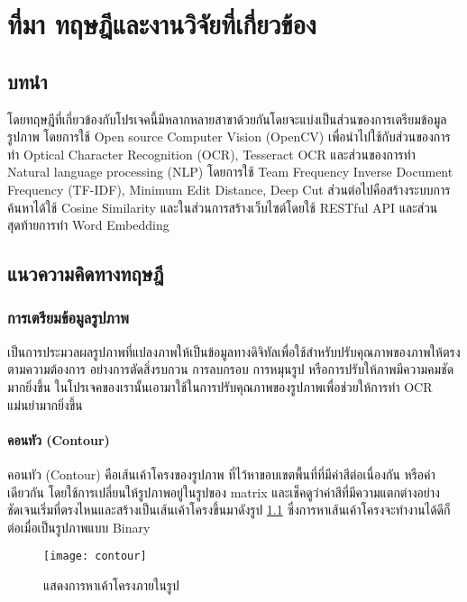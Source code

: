 \chapter{ที่มา ทฤษฎีและงานวิจัยที่เกี่ยวข้อง}
\section{บทนำ}

โดยทฤษฎีที่เกี่ยวข้องกับโปรเจคนี้มีหลากหลายสาขาด้วยกันโดยจะแบ่งเป็นส่วนของการเตรียมข้อมูลรูปภาพ โดยการใช้ Open source Computer Vision (OpenCV) เพื่อนำไปใช้กับส่วนของการทำ Optical Character Recognition (OCR), Tesseract OCR และส่วนของการทำ Natural language processing (NLP) โดยการใช้ Team Frequency Inverse Document Frequency (TF-IDF), Minimum Edit Distance,  Deep Cut ส่วนต่อไปคือสร้างระบบการค้นหาได้ใช้ Cosine Similarity และในส่วนการสร้างเว็บไซต์โดยใช้ RESTful API และส่วนสุดท้ายการทำ Word Embedding 

\section{แนวความคิดทางทฤษฎี}

\subsection{การเตรียมข้อมูลรูปภาพ}

เป็นการประมวลผลรูปภาพที่แปลงภาพให้เป็นข้อมูลทางดิจิทัลเพื่อใช้สำหรับปรับคุณภาพของภาพให้ตรงตามความต้องการ อย่างการตัดสิ่งรบกวน การลบกรอบ การหมุนรูป หรือการปรับให้ภาพมีความคมชัดมากยิ่งขึ้น ในโปรเจคของเรานั้นเอามาใช้ในการปรับคุณภาพของรูปภาพเพื่อช่วยให้การทำ OCR แม่นยำมากยิ่งขึ้น 

\subsubsection{คอนทัว (Contour) }

คอนทัว (Contour) \cite{doxygen} คือเส้นเค้าโครงของรูปภาพ ที่ไว้หาขอบเขตพื้นที่ที่มีค่าสีต่อเนื่องกัน หรือค่าเดียวกัน โดยใช้การเปลี่ยนให้รูปภาพอยู่ในรูปของ matrix และเช็คดูว่าค่าสีที่มีความแตกต่างอย่างชัดเจนเริ่มที่ตรงไหนและสร้างเป็นเส้นเค้าโครงขึ้นมาดังรูป \ref{fig:contour} ซึ่งการหาเส้นเค้าโครงจะทำงานได้ดีก็ต่อเมื่อเป็นรูปภาพแบบ Binary 

\begin{figure}[!h]
    \centering
    \texttt{[image: contour]}
    \caption{แสดงการหาเค้าโครงภายในรูป}\label{fig:contour}
\end{figure}

